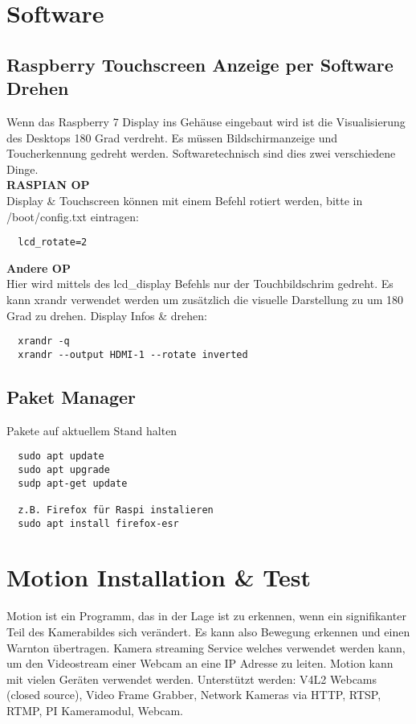 \newpage
\section{Software}

\subsection{Raspberry Touchscreen Anzeige per Software Drehen}
Wenn das Raspberry 7\grqq{} Display ins Gehäuse eingebaut wird ist die 
Visualisierung des Desktops 180 Grad verdreht. Es müssen Bildschirmanzeige 
und Toucherkennung gedreht werden. Softwaretechnisch sind dies zwei verschiedene 
Dinge.\\

\textbf{RASPIAN OP}\\
Display \& Touchscreen können mit einem Befehl rotiert werden, 
bitte in /boot/config.txt eintragen:
\begin{verbatim}
  lcd_rotate=2
\end{verbatim}

\textbf{Andere OP}\\
Hier wird mittels des lcd\_display Befehls nur der Touchbildschrim 
gedreht. Es kann xrandr verwendet werden um zusätzlich die visuelle Darstellung zu 
um 180 Grad zu drehen. Display Infos \& drehen:
\begin{verbatim}
  xrandr -q
  xrandr --output HDMI-1 --rotate inverted
\end{verbatim}

\subsection{Paket Manager}
Pakete auf aktuellem Stand halten
\begin{verbatim}
  sudo apt update
  sudo apt upgrade
  sudp apt-get update

  z.B. Firefox für Raspi instalieren
  sudo apt install firefox-esr
\end{verbatim}

\section{Motion Installation \& Test}

Motion ist ein Programm, das in der Lage ist zu erkennen, wenn ein signifikanter Teil des Kamerabildes sich verändert. Es kann also Bewegung erkennen und einen Warnton übertragen. Kamera streaming Service welches verwendet werden kann, um den Videostream einer Webcam an eine IP Adresse zu leiten. Motion kann mit vielen Geräten verwendet werden. Unterstützt werden: V4L2 Webcams (closed source), Video Frame Grabber, Network Kameras via HTTP, RTSP, RTMP, PI Kameramodul, Webcam.\\

